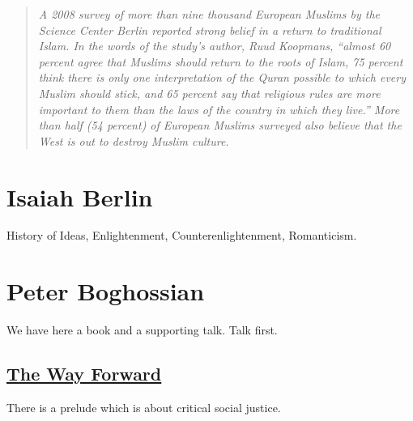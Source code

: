 \documentclass[10pt,titlepage]{book}
\begin{document}
\begin{quote}
{\it
A 2008 survey of more than nine thousand European Muslims
by the Science Center Berlin reported strong belief in a return
to traditional Islam. In the words of the study’s author, Ruud
Koopmans, “almost 60 percent agree that Muslims should return
to the roots of Islam, 75 percent think there is only one interpretation of the Quran possible to which every Muslim should stick,
and 65 percent say that religious rules are more important to
them than the laws of the country in which they live.” More than
half (54 percent) of European Muslims surveyed also believe
that the West is out to destroy Muslim culture.
}
\end{quote}

\section{Isaiah Berlin}\label{IsaiahBerlin}

History of Ideas, Enlightenment, Counterenlightenment, Romanticism.

\section{Peter Boghossian}\label{Boghossian}

We have here a book and a supporting talk.
Talk first.

\subsection{\href{https://www.youtube.com/watch?v=LiymUd9FjHA}{The Way Forward}}

There is a prelude which is about critical social justice.
\end{document}
